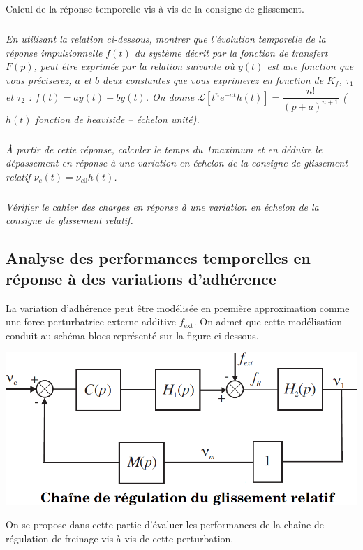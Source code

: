 \documentclass[10pt,fleqn]{article} %
\begin{document}
\begin{multicols}{2}
\begin{obj}
Calcul de la réponse temporelle vis-à-vis de la consigne de glissement. 
\end{obj}

\subparagraph{}\textit{En utilisant la relation ci-dessous, montrer que l’évolution temporelle de
la réponse impulsionnelle $f(t)$ du système décrit par la fonction de transfert $F(p)$, peut être exprimée par la relation suivante où $y(t)$ est une fonction que vous préciserez, $a$ et $b$ deux constantes que vous exprimerez en fonction de $K_f$, $\tau_1$ et $\tau_2$ : $f(t)=ay(t)+b\dot{y}(t)$. On donne $\mathcal{L}\left[ t^n e^{-at} h(t)\right]=\dfrac{n!}{\left(p+a\right)^{n+1}}$ ($h(t)$ fonction de heaviside -- échelon unité).}

\subparagraph{}\textit{À partir de cette réponse, calculer le temps du 1\ier maximum et en déduire le
dépassement en réponse à une variation en échelon de la consigne de glissement
relatif $\nu_c(t)=\nu_{c0}h(t)$.}

\subparagraph{}\textit{Vérifier le cahier des charges en réponse à une variation en échelon de la consigne
de glissement relatif.}

\subsection*{Analyse des performances temporelles en réponse à des variations d’adhérence}

La variation d’adhérence peut être modélisée en première approximation comme une force perturbatrice externe additive $f_{\text{ext}}$. On admet que cette modélisation conduit au schéma-blocs représenté sur la figure ci-dessous.


\begin{center}
\includegraphics[width=\linewidth]{images/fig_07}
\end{center}


On se propose dans cette partie d’évaluer les performances de la chaîne de régulation de freinage vis-à-vis de cette perturbation.


\end{multicols}
\end{document}
